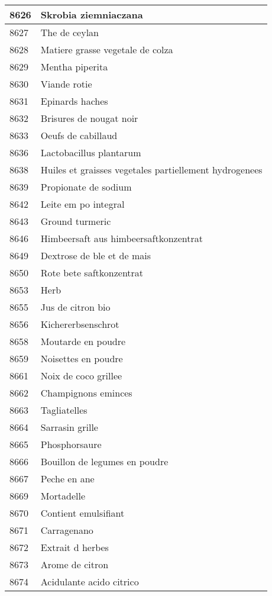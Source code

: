 \begin{longtable}{|l|l|}
8626 & Skrobia ziemniaczana \\ \hline 
8627 & The de ceylan \\ \hline 
8628 & Matiere grasse vegetale de colza \\ \hline 
8629 & Mentha piperita \\ \hline 
8630 & Viande rotie \\ \hline 
8631 & Epinards haches \\ \hline 
8632 & Brisures de nougat noir \\ \hline 
8633 & Oeufs de cabillaud \\ \hline 
8636 & Lactobacillus plantarum \\ \hline 
8638 & Huiles et graisses vegetales partiellement hydrogenees \\ \hline 
8639 & Propionate de sodium \\ \hline 
8642 & Leite em po integral \\ \hline 
8643 & Ground turmeric \\ \hline 
8646 & Himbeersaft aus himbeersaftkonzentrat \\ \hline 
8649 & Dextrose de ble et de mais \\ \hline 
8650 & Rote bete saftkonzentrat \\ \hline 
8653 & Herb \\ \hline 
8655 & Jus de citron bio \\ \hline 
8656 & Kichererbsenschrot \\ \hline 
8658 & Moutarde en poudre \\ \hline 
8659 & Noisettes en poudre \\ \hline 
8661 & Noix de coco grillee \\ \hline 
8662 & Champignons eminces \\ \hline 
8663 & Tagliatelles \\ \hline 
8664 & Sarrasin grille \\ \hline 
8665 & Phosphorsaure \\ \hline 
8666 & Bouillon de legumes en poudre \\ \hline 
8667 & Peche en ane \\ \hline 
8669 & Mortadelle \\ \hline 
8670 & Contient emulsifiant \\ \hline 
8671 & Carragenano \\ \hline 
8672 & Extrait d herbes \\ \hline 
8673 & Arome de citron \\ \hline 
8674 & Acidulante acido citrico \\ \hline 

\end{longtable}
